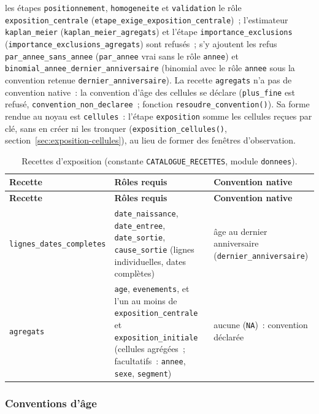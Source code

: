\documentclass[a4paper,11pt]{article}
\newcommand{\code}[1]{\texttt{\small #1}}
\newcommand{\catalogue}[2]{\code{#2}}
\begin{document}
les étapes \code{positionnement}, \code{homogeneite} et \code{validation} le
rôle \code{exposition\_centrale} (\code{etape\_exige\_exposition\_centrale})~;
l'estimateur \code{kaplan\_meier} (\code{kaplan\_meier\_agregats}) et
l'étape \code{importance\_exclusions}
(\code{importance\_exclusions\_agregats}) sont refusés~; s'y ajoutent les
refus \code{par\_annee\_sans\_annee} (\code{par\_annee} vrai sans le rôle
\code{annee}) et \code{binomial\_annee\_dernier\_anniversaire} (binomial
avec le rôle \code{annee} sous la convention retenue
\code{dernier\_anniversaire}). La recette \code{agregats} n'a pas de
convention native~: la convention d'âge des cellules se déclare
(\code{plus\_fine} est refusé, \code{convention\_non\_declaree}~; fonction
\code{resoudre\_convention()}). Sa forme rendue au noyau est
\code{cellules}~: l'étape \code{exposition} somme les cellules reçues par
clé, sans en créer ni les tronquer (\code{exposition\_cellules()},
section~\ref{sec:exposition-cellules}), au lieu
de former des fenêtres d'observation.

{\small
{}
\begin{longtable}{@{}p{4.4cm}p{5.6cm}p{4.6cm}@{}}
\caption{Recettes d'exposition (constante \code{CATALOGUE\_RECETTES},
module \code{donnees}).}
\label{tab:recettes}\\
\rowcolor{tableheader}
\textcolor{financeblue}{\textbf{Recette}} &
\textcolor{financeblue}{\textbf{Rôles requis}} &
\textcolor{financeblue}{\textbf{Convention native}} \\
\endfirsthead
\rowcolor{tableheader}
\textcolor{financeblue}{\textbf{Recette}} &
\textcolor{financeblue}{\textbf{Rôles requis}} &
\textcolor{financeblue}{\textbf{Convention native}} \\
\endhead
\catalogue{recettes}{lignes\_dates\_completes} & \code{date\_naissance},
\code{date\_entree}, \code{date\_sortie}, \code{cause\_sortie} (lignes
individuelles, dates complètes) & âge au dernier anniversaire
(\code{dernier\_anniversaire}) \\
\catalogue{recettes}{agregats} & \code{age}, \code{evenements}, et l'un au
moins de \code{exposition\_centrale} et \code{exposition\_initiale}
(cellules agrégées~; facultatifs~: \code{annee}, \code{sexe},
\code{segment}) & aucune (\code{NA})~: convention déclarée \\
\end{longtable}
}

\subsubsection*{Conventions d'âge}
\end{document}
